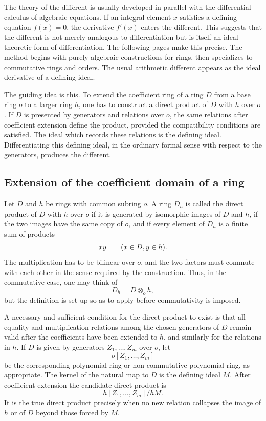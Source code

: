 \documentclass[12pt]{article}
\begin{document}
The theory of the different is usually developed in parallel with the differential calculus of algebraic equations. If an integral element \(x\) satisfies a defining equation \(f(x)=0\), the derivative \(f'(x)\) enters the different. This suggests that the different is not merely analogous to differentiation but is itself an ideal-theoretic form of differentiation. The following pages make this precise. The method begins with purely algebraic constructions for rings, then specializes to commutative rings and orders. The usual arithmetic different appears as the ideal derivative of a defining ideal.

The guiding idea is this. To extend the coefficient ring of a ring \(D\) from a base ring \(o\) to a larger ring \(h\), one has to construct a direct product of \(D\) with \(h\) over \(o\). If \(D\) is presented by generators and relations over \(o\), the same relations after coefficient extension define the product, provided the compatibility conditions are satisfied. The ideal which records these relations is the defining ideal. Differentiating this defining ideal, in the ordinary formal sense with respect to the generators, produces the different.

\subsection{Extension of the coefficient domain of a ring}

Let \(D\) and \(h\) be rings with common subring \(o\). A ring \(D_h\) is called the direct product of \(D\) with \(h\) over \(o\) if it is generated by isomorphic images of \(D\) and \(h\), if the two images have the same copy of \(o\), and if every element of \(D_h\) is a finite sum of products
\[
  x y\qquad(x\in D,\\ y\in h).
\]
The multiplication has to be bilinear over \(o\), and the two factors must commute with each other in the sense required by the construction. Thus, in the commutative case, one may think of
\[
  D_h=D\otimes_o h,
\]
but the definition is set up so as to apply before commutativity is imposed.

A necessary and sufficient condition for the direct product to exist is that all equality and multiplication relations among the chosen generators of \(D\) remain valid after the coefficients have been extended to \(h\), and similarly for the relations in \(h\). If \(D\) is given by generators \(Z_1,\ldots,Z_m\) over \(o\), let
\[
  o[Z_1,\ldots,Z_m]
\]
be the corresponding polynomial ring or non-commutative polynomial ring, as appropriate. The kernel of the natural map to \(D\) is the defining ideal \(M\). After coefficient extension the candidate direct product is
\[
  h[Z_1,
  \ldots,Z_m]/hM.
\]
It is the true direct product precisely when no new relation collapses the image of \(h\) or of \(D\) beyond those forced by \(M\).
\end{document}
